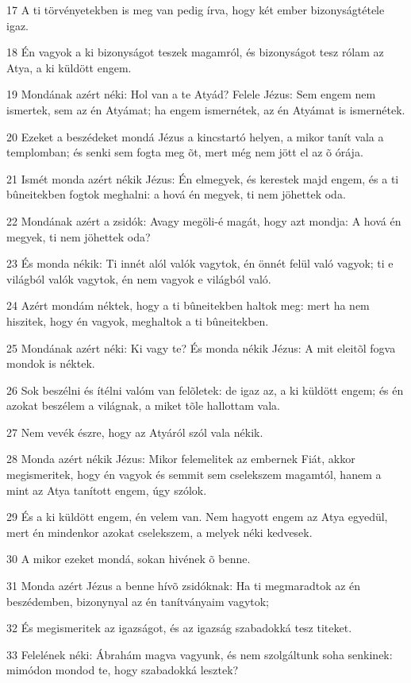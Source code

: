 \par 17 A ti törvényetekben is meg van pedig írva, hogy két ember bizonyságtétele igaz.
\par 18 Én vagyok a ki bizonyságot teszek magamról, és bizonyságot tesz rólam az Atya, a ki küldött engem.
\par 19 Mondának azért néki: Hol van a te Atyád? Felele Jézus: Sem engem nem ismertek, sem az én Atyámat; ha engem ismernétek, az én Atyámat is ismernétek.
\par 20 Ezeket a beszédeket mondá Jézus a kincstartó helyen, a mikor tanít vala a templomban; és senki sem fogta meg õt, mert még nem jött el az õ órája.
\par 21 Ismét monda azért nékik Jézus: Én elmegyek, és kerestek majd engem, és a ti bûneitekben fogtok meghalni: a hová én megyek, ti nem jöhettek oda.
\par 22 Mondának azért a zsidók: Avagy megöli-é magát, hogy azt mondja: A hová én megyek, ti nem jöhettek oda?
\par 23 És monda nékik: Ti innét alól valók vagytok, én önnét felül való vagyok; ti e világból valók vagytok, én nem vagyok e világból való.
\par 24 Azért mondám néktek, hogy a ti bûneitekben haltok meg: mert ha nem hiszitek, hogy én vagyok, meghaltok a ti bûneitekben.
\par 25 Mondának azért néki: Ki vagy te? És monda nékik Jézus: A mit eleitõl fogva mondok is néktek.
\par 26 Sok beszélni és ítélni valóm van felõletek: de igaz az, a ki küldött engem; és én azokat beszélem a világnak, a miket tõle hallottam vala.
\par 27 Nem vevék észre, hogy az Atyáról szól vala nékik.
\par 28 Monda azért nékik Jézus: Mikor felemelitek az embernek Fiát, akkor megismeritek, hogy én vagyok és semmit sem cselekszem magamtól, hanem a mint az Atya tanított engem, úgy szólok.
\par 29 És a ki küldött engem, én velem van. Nem hagyott engem az Atya egyedül, mert én mindenkor azokat cselekszem, a melyek néki kedvesek.
\par 30 A mikor ezeket mondá, sokan hivének õ benne.
\par 31 Monda azért Jézus a benne hívõ zsidóknak: Ha ti megmaradtok az én beszédemben, bizonynyal az én tanítványaim vagytok;
\par 32 És megismeritek az igazságot, és az igazság szabadokká tesz titeket.
\par 33 Felelének néki: Ábrahám magva vagyunk, és nem szolgáltunk soha senkinek: mimódon mondod te, hogy szabadokká lesztek?
